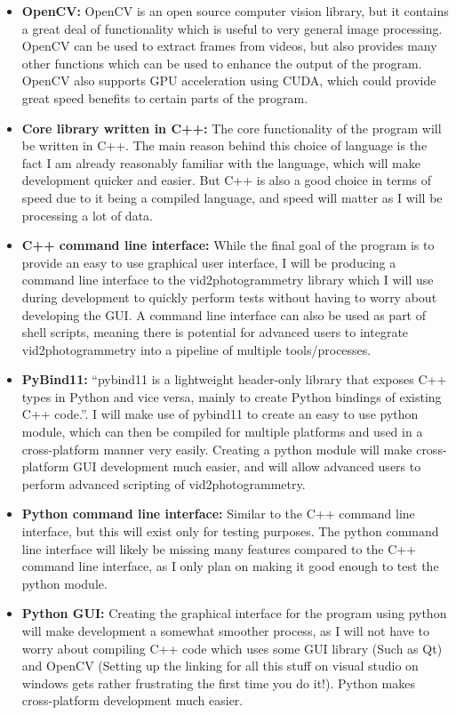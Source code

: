 \documentclass[11pt]{report}
\begin{document}
\begin{itemize}
\item \textbf{OpenCV:}
OpenCV is an open source computer vision library, but it contains a great deal of functionality which is useful to very general image processing. OpenCV can be used to extract frames from videos, but also provides many other functions which can be used to enhance the output of the program. OpenCV also supports GPU acceleration using CUDA, which could provide great speed benefits to certain parts of the program.
\item \textbf{Core library written in C++:}
The core functionality of the program will be written in C++. The main reason behind this choice of language is the fact I am already reasonably familiar with the language, which will make development quicker and easier. But C++ is also a good choice in terms of speed due to it being a compiled language, and speed will matter as I will be processing a lot of data.
\item \textbf{C++ command line interface:}
While the final goal of the program is to provide an easy to use graphical user interface, I will be producing a command line interface to the vid2photogrammetry library which I will use during development to quickly perform tests without having to worry about developing the GUI. A command line interface can also be used as part of shell scripts, meaning there is potential for advanced users to integrate vid2photogrammetry into a pipeline of multiple tools/processes.
\item \textbf{PyBind11:}
``pybind11 is a lightweight header-only library that exposes C++ types in Python and vice versa, mainly to create Python bindings of existing C++ code.''. I will make use of pybind11 to create an easy to use python module, which can then be compiled for multiple platforms and used in a cross-platform manner very easily. Creating a python module will make cross-platform GUI development much easier, and will allow advanced users to perform advanced scripting of vid2photogrammetry.
\item \textbf{Python command line interface:} Similar to the C++ command line interface, but this will exist only for testing purposes. The python command line interface will likely be missing many features compared to the C++ command line interface, as I only plan on making it good enough to test the python module.
\item \textbf{Python GUI:}
Creating the graphical interface for the program using python will make development a somewhat smoother process, as I will not have to worry about compiling C++ code which uses some GUI library (Such as Qt) and OpenCV (Setting up the linking for all this stuff on visual studio on windows gets rather frustrating the first time you do it!). Python makes cross-platform development much easier.

\end{itemize}
\end{document}
